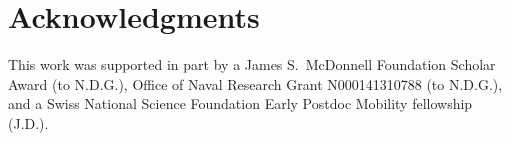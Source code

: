 \documentclass[12pt]{article}
\begin{document}
\section*{Acknowledgments}
This work was supported in part by a James S.~McDonnell Foundation Scholar Award (to N.D.G.), Office of Naval Research Grant N000141310788 (to N.D.G.), and a Swiss National Science Foundation Early Postdoc Mobility fellowship (J.D.).



   
  
\end{document}
